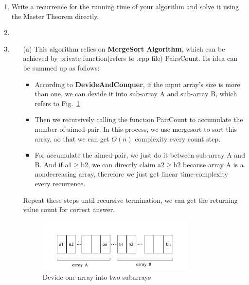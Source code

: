 \documentclass[12pt,a4paper]{article}
\makeatletter
\newtheorem*{solution}{Solution}
\theoremstyle{definition}
\renewenvironment{solution}[1][Solution] {\par\pushQED{\qed}\normalfont\topsep6\p@\@plus6\p@\relax\trivlist\item[\hskip\labelsep\bfseries#1\@addpunct{.}]\ignorespaces}{\popQED\endtrivlist\@endpefalse} \makeatother
\makeatother
\begin{document}
\begin{enumerate}
\begin{enumerate}
        \item
        Write a recurrence for the running time of your algorithm and solve it using the Master Theorem directly.
        \begin{solution}\item
        \renewcommand{\qedsymbol}{}
            \begin{itemize}
            \item [(a)] This algorithm relies on \textbf{MergeSort Algorithm}, which can be achieved by private function(refers to .cpp file) PairsCount. Its idea can be summed up as follows:
                \begin{itemize}
                \item According to \textbf{DevideAndConquer}, if the input array's size is more than one, we can devide it into sub-array A and sub-array B, which refers to Fig.~\ref{Array}
                \item 
                Then we recursively calling the function PairCount to accumulate the number of aimed-pair.
                In this process, we use mergesort to sort this array, ao that we can get $O(n)$ complexity every count step.
                \item 
                For accumulate the aimed-pair, we just do it between sub-array A and B. And if a1$\geq$b2, we can directly claim a2$\geq$b2 because array A is a nondecreasing array, therefore we just get linear time-complexity every recurrence.
                \end{itemize}
                Repeat these steps until recursive termination, we can get the returning value count for correct answer.
                \begin{figure}[htbp]
                \centering
                \includegraphics[width=0.8\textwidth]{figures/1_2.pdf}
                \caption{Devide one array into two subarrays}\label{Array}
                \end{figure}
                

\end{itemize}
\end{solution}
\end{enumerate}
\end{enumerate}
\end{document}
